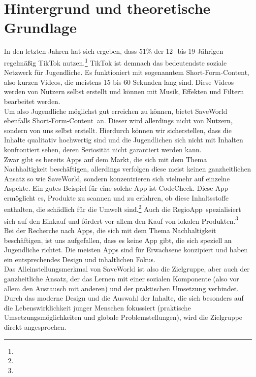 \documentclass[../main.tex]{subfiles}
\begin{document}
    \chapter{Hintergrund und theoretische Grundlage}
    In den letzten Jahren hat sich ergeben, dass 51\% der 12- bis 19-Jährigen regelmäßig TikTok nutzen.\footnote{}
    TikTok ist demnach das bedeutendste soziale Netzwerk für Jugendliche.
    Es funktioniert mit sogenanntem \dq Short-Form-Content\dq, also kurzen Videos, die meistens 15 bis 60 Sekunden lang sind.
    Diese Videos werden von Nutzern selbst erstellt und können mit Musik, Effekten und Filtern bearbeitet werden.
    \\
    Um also Jugendliche möglichst gut erreichen zu können, bietet SaveWorld ebenfalls \dq Short-Form-Content\dq\ an.
    Dieser wird allerdings nicht von Nutzern, sondern von uns selbst erstellt.
    Hierdurch können wir sicherstellen, dass die Inhalte qualitativ hochwertig sind und die Jugendlichen sich nicht mit Inhalten konfrontiert sehen, deren Seriosität nicht garantiert werden kann.
    \\
    Zwar gibt es bereits Apps auf dem Markt, die sich mit dem Thema Nachhaltigkeit beschäftigen, allerdings verfolgen diese meist keinen ganzheitlichen Ansatz so wie SaveWorld, sondern konzentrieren sich vielmehr auf einzelne Aspekte.
    Ein gutes Beispiel für eine solche App ist \dq CodeCheck\dq.
    Diese App ermöglicht es, Produkte zu scannen und zu erfahren, ob diese Inhaltsstoffe enthalten, die schädlich für die Umwelt sind.\footnote{}
    Auch die \dq RegioApp\dq\ spezialisiert sich auf den Einkauf und fördert vor allem den Kauf von lokalen Produkten.\footnote{}
    \\
    Bei der Recherche nach Apps, die sich mit dem Thema Nachhaltigkeit beschäftigen, ist uns aufgefallen, dass es keine App gibt, die sich speziell an Jugendliche richtet.
    Die meisten Apps sind für Erwachsene konzipiert und haben ein entsprechendes Design und inhaltlichen Fokus.
    \\
    Das Alleinstellungsmerkmal von SaveWorld ist also die Zielgruppe, aber auch der ganzheitliche Ansatz, der das Lernen mit einer sozialen Komponente (also vor allem den Austausch mit anderen) und der praktischen Umsetzung verbindet.
    Durch das moderne Design und die Auswahl der Inhalte, die sich besonders auf die Lebenswirklichkeit junger Menschen fokussiert
    (praktische Umsetzungsmöglichkeiten und globale Problemstellungen), wird die Zielgruppe direkt angesprochen.
\end{document}
